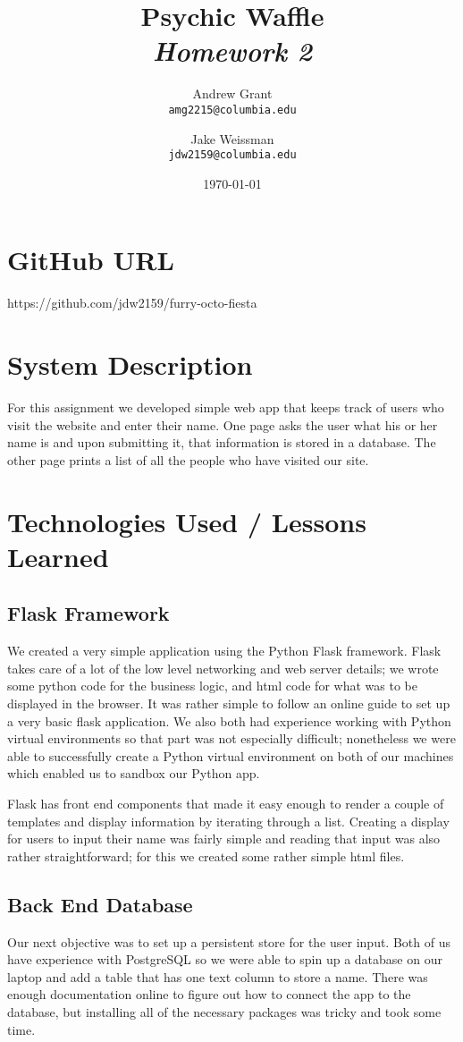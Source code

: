 \documentclass{article}
\title{Psychic Waffle \\
	\textit{Homework 2}}
\author{
    Andrew Grant\\
    \texttt{amg2215@columbia.edu}
    \and
    Jake Weissman\\
    \texttt{jdw2159@columbia.edu}
}
\date{\today}
\begin{document}
\maketitle

\section{GitHub URL}
https://github.com/jdw2159/furry-octo-fiesta

\section{System Description}
For this assignment we developed simple web app that keeps track of users who visit the website and enter their name. One page asks the user what his or her name is and upon submitting it, that information is stored in a database. The other page prints a list of all the people who have visited our site.

\section{Technologies Used / Lessons Learned}
\subsection{Flask Framework}
We created a very simple application using the Python Flask framework. Flask takes care of a lot of the low level networking and web server details; we wrote some python code for the business logic, and html code for what was to be displayed in the browser. It was rather simple to follow an online guide to set up a very basic flask application. We also both had experience working with Python virtual environments so that part was not especially difficult; nonetheless we were able to successfully create a Python virtual environment on both of our machines which enabled us to sandbox our Python app.
\par Flask has front end components that made it easy enough to render a couple of templates and display information by iterating through a list. Creating a display for users to input their name was fairly simple and reading that input was also rather straightforward; for this we created some rather simple html files.
\subsection{Back End Database }
Our next objective was to set up a persistent store for the user input. Both of us have experience with PostgreSQL so we were able to spin up a database on our laptop and add a table that has one text column to store a name. There was enough documentation online to figure out how to connect the app to the database, but installing all of the necessary packages was tricky and took some time.
\end{document}
